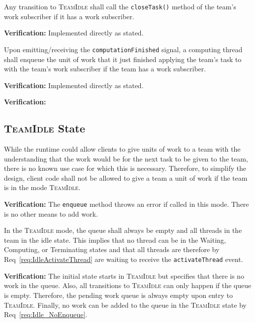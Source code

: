 \documentclass{article}
\newcommand{\TeamIdle}          {\textsc{TeamIdle}}
\begin{document}
\begin{req}
Any transition to {\TeamIdle} shall call the \texttt{closeTask()} method of the
team's work subscriber if it has a work subscriber.
\end{req}
\textbf{Verification:}\hspace{0.125in}  Implemented directly as stated.

\begin{req}
Upon emitting/receiving the \texttt{computationFinished} signal, a computing
thread shall enqueue the unit of work that it just finished applying the team's
task to with the team's work subscriber if the team has a work subscriber.
\end{req}
\textbf{Verification:}\hspace{0.125in}  Implemented directly as stated.

\begin{req}
\end{req}
\textbf{Verification:}\hspace{0.125in}

\subsection{{\TeamIdle} State}
\begin{req}
\label{req:Idle_NoEnqueue}
While the runtime could allow clients to give units of work to a team with the
understanding that the work would be for the next task to be given to the team,
there is no known use case for which this is necessary.  Therefore, to simplify
the design, client code shall not be allowed to give a team a unit of work if
the team is in the mode \TeamIdle.  
\end{req}
\textbf{Verification:}\hspace{0.125in}  The \texttt{enqueue} method throws an
error if called in this mode.  There is no other means to add work.

\begin{req}
In the {\TeamIdle} mode, the queue shall always be empty and all threads in the
team in the idle state.  This implies that no thread can be in the Waiting,
Computing, or Terminating states and that all threads are therefore by
Req~\ref{req:IdleActivateThread} are waiting to receive the
\texttt{activateThread} event.
\end{req}
\textbf{Verification:}\hspace{0.125in}  The initial state starts in {\TeamIdle}
but specifies that there is no work in the queue.  Also, all transitions to
{\TeamIdle} can only happen if the queue is empty.  Therefore, the pending work
queue is always empty upon entry to \TeamIdle.  Finally, no work can be added
to the queue in the {\TeamIdle} state by Req~\ref{req:Idle_NoEnqueue}.\\
\end{document}

